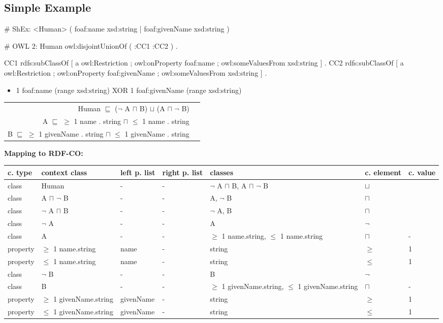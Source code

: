 \documentclass{llncs}
\newenvironment{gcotable}{
  \scriptsize
  \sffamily
  \vspace{0cm}
	\begin{center}
	\textbf{\vspace{0.4cm}Mapping to RDF-CO:} \\
  \begin{tabular}{l|l|l|l|l|l|l}
	\hline
  \textbf{c. type} & \textbf{context class} & \textbf{left p. list} & \textbf{right p. list} & \textbf{classes} & \textbf{c. element} & \textbf{c. value} \\
  \hline

}{
  \hline
  \end{tabular}
	\end{center}
}
\newenvironment{DL}{
  \vspace{0cm}
	\begin{center}
  \begin{tabular}{r l}

}{
  \end{tabular}
	\end{center}
}
\begin{document}
\subsection{Simple Example}

\begin{ex}
# ShEx:
<Human> { (  
    foaf:name xsd:string | 
    foaf:givenName xsd:string ) }
\end{ex}

\begin{ex}
# OWL 2:
Human owl:disjointUnionOf ( :CC1 :CC2 ) . 

CC1 rdfs:subClassOf [
    a owl:Restriction ;
    owl:onProperty foaf:name ;
    owl:someValuesFrom xsd:string ] .
CC2 rdfs:subClassOf [
    a owl:Restriction ;
    owl:onProperty foaf:givenName ;
    owl:someValuesFrom xsd:string ] .
\end{ex}

\begin{itemize}
	\item 1 foaf:name (range xsd:string) XOR 1 foaf:givenName (range xsd:string)
\end{itemize}

\begin{DL}
Human $\sqsubseteq$ ($\neg$ A $\sqcap$ B) $\sqcup$ (A $\sqcap$ $\neg$ B) \\
A $\sqsubseteq$ $\geq$ 1 name . string $\sqcap$ $\leq$ 1 name . string \\
B $\sqsubseteq$ $\geq$ 1 givenName . string $\sqcap$ $\leq$ 1 givenName . string \\
\end{DL}

\begin{gcotable}
class & Human & - & - & $\neg$ A $\sqcap$ B, A $\sqcap$ $\neg$ B & $\sqcup$ \\
\hline
class & A $\sqcap$ $\neg$ B & - & - & A, $\neg$ B & $\sqcap$ \\
class & $\neg$ A $\sqcap$ B & - & - & $\neg$ A, B & $\sqcap$ \\
\hline
class & $\neg$ A & - & - & A & $\neg$ \\
class & A & - & - & $\geq$ 1 name.string, $\leq$ 1 name.string & $\sqcap$ & - \\
property & $\geq$ 1 name.string & name & - & string & $\geq$ & 1 \\
property & $\leq$ 1 name.string & name & - & string & $\leq$ & 1 \\
\hline
class & $\neg$ B & - & - & B & $\neg$ \\
class & B & - & - & $\geq$ 1 givenName.string, $\leq$ 1 givenName.string & $\sqcap$ & - \\
property & $\geq$ 1 givenName.string & givenName & - & string & $\geq$ & 1 \\
property & $\leq$ 1 givenName.string & givenName & - & string & $\leq$ & 1 \\
\end{gcotable}
\end{document}
